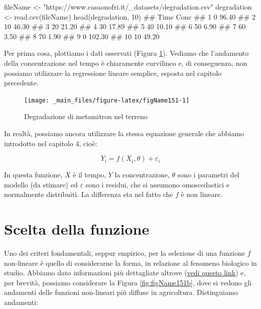 \documentclass[a4paper,12pt,oneside]{book}
\newenvironment{Shaded}{\begin{snugshade}}{\end{snugshade}}
\newcommand{\DecValTok}[1]{#1}
\newcommand{\StringTok}[1]{#1}
\newcommand{\DocumentationTok}[1]{#1}
\newcommand{\OtherTok}[1]{#1}
\newcommand{\FunctionTok}[1]{#1}
\newcommand{\NormalTok}[1]{#1}
\begin{document}
\begin{Shaded}
\begin{Highlighting}[]
\NormalTok{fileName }\OtherTok{\textless{}{-}} \StringTok{"https://www.casaonofri.it/\_datasets/degradation.csv"}
\NormalTok{degradation }\OtherTok{\textless{}{-}} \FunctionTok{read.csv}\NormalTok{(fileName)}
\FunctionTok{head}\NormalTok{(degradation, }\DecValTok{10}\NormalTok{)}
\DocumentationTok{\#\#    Time   Conc}
\DocumentationTok{\#\# 1     0  96.40}
\DocumentationTok{\#\# 2    10  46.30}
\DocumentationTok{\#\# 3    20  21.20}
\DocumentationTok{\#\# 4    30  17.89}
\DocumentationTok{\#\# 5    40  10.10}
\DocumentationTok{\#\# 6    50   6.90}
\DocumentationTok{\#\# 7    60   3.50}
\DocumentationTok{\#\# 8    70   1.90}
\DocumentationTok{\#\# 9     0 102.30}
\DocumentationTok{\#\# 10   10  49.20}
\end{Highlighting}
\end{Shaded}

Per prima cosa, plottiamo i dati osservati (Figura \ref{fig:figName151}). Vediamo che l'andamento della concentrazione nel tempo è chiaramente curvilineo e, di conseguenza, non possiamo utilizzare la regressione lineare semplice, esposta nel capitolo precedente.

\begin{figure}

{\centering \texttt{[image: \_main\_files/figure-latex/figName151-1]} 

}

\caption{Degradazione di metamitron nel terreno}\label{fig:figName151}
\end{figure}

In realtà, possiamo ancora utilizzare la stessa equazione generale che abbiamo introdotto nel capitolo 4, cioè:

\[ Y_i = f(X_i, \theta) + \varepsilon_i \]

In questa funzione, \(X\) è il tempo, \(Y\) la concentrazione, \(\theta\) sono i parametri del modello (da stimare) ed \(\varepsilon\) sono i residui, che si assumono omoscedastici e normalmente distribuiti. La differenza sta nel fatto che \(f\) è non lineare.

\hypertarget{scelta-della-funzione}{%
\section{Scelta della funzione}\label{scelta-della-funzione}}

Uno dei criteri fondamentali, seppur empirico, per la selezione di una funzione \(f\) non-lineare è quello di considerarne la forma, in relazione al fenomeno biologico in studio. Abbiamo dato informazioni più dettagliate altrove (\href{https://www.statforbiology.com/2020/stat_nls_usefulfunctions/}{vedi questo link}) e, per brevità, possiamo considerare la Figura \ref{fig:figName151b}, dove si vedono gli andamenti delle funzioni non-lineari più diffuse in agricoltura. Distinguiamo andamenti:
\end{document}
